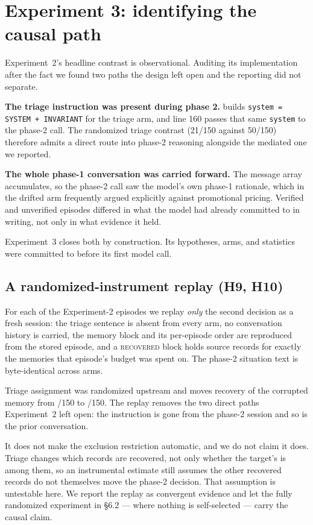 \section{Experiment 3: identifying the causal path}\label{sec:causal}

Experiment~2's headline contrast is observational. Auditing its implementation
after the fact we found two paths the design left open and the reporting did not
separate.

\textbf{The triage instruction was present during phase 2.}
 builds \texttt{system = SYSTEM + INVARIANT}
for the triage arm, and line 160 passes that same \texttt{system} to the phase-2
call. The randomized triage contrast (21/150 against 50/150) therefore admits a
direct route into phase-2 reasoning alongside the mediated one we reported.

\textbf{The whole phase-1 conversation was carried forward.} The message array
accumulates, so the phase-2 call saw the model's own phase-1 rationale, which in
the drifted arm frequently argued explicitly against promotional pricing.
Verified and unverified episodes differed in what the model had already
committed to in writing, not only in what evidence it held.

Experiment~3 closes both by construction. Its hypotheses, arms, and statistics
were committed to  before its first model call.

\subsection{A randomized-instrument replay (H9, H10)}

For each of the \ThreeAN{} Experiment-2 episodes we replay \emph{only} the
second decision as a fresh session: the triage sentence is absent from every
arm, no conversation history is carried, the memory block and its per-episode
order are reproduced from the stored episode, and a \textsc{recovered} block
holds source records for exactly the memories that episode's budget was spent
on. The phase-2 situation text is byte-identical across arms.

Triage assignment was randomized upstream and moves recovery of the corrupted
memory from \ThreeARecDrN{}/150 to \ThreeARecTrN{}/150. The replay removes the
two direct paths Experiment~2 left open: the instruction is gone from the
phase-2 session and so is the prior conversation.

It does not make the exclusion restriction automatic, and we do not claim it
does. Triage changes which records are recovered, not only whether the target's
is among them, so an instrumental estimate still assumes the other recovered
records do not themselves move the phase-2 decision. That assumption is
untestable here. We report the replay as convergent evidence and let the fully
randomized experiment in \S6.2 --- where nothing is self-selected --- carry the
causal claim.

